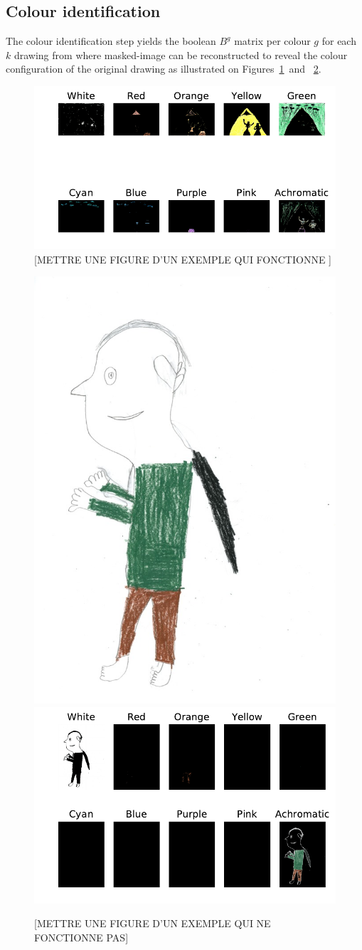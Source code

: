 \documentclass[11pt,a4paper]{article}
\begin{document}
\subsection{Colour identification}

The colour identification step yields the boolean $B^g$ matrix per colour $g$ for each $k$ drawing from where masked-image can be reconstructed to reveal the colour configuration of the original drawing as illustrated on Figures~\ref{fig:example1}~and ~\ref{fig:example2}.

\begin{figure}[!h]
	\centering
	\includegraphics[width=0.62\linewidth]{figures/ru08_bo_f_pb_07_05_ali-rno_filter_mask.pdf}\hfil
	\caption{{[METTRE UNE FIGURE D'UN EXEMPLE QUI FONCTIONNE ]} }
	\label{fig:example1}
\end{figure}

\begin{figure}[!h]
	\centering
	\includegraphics[width=0.32\linewidth]{figures/ch15_fr_m_rrs_08_08_fim-r.jpg}
	\includegraphics[width=0.62\linewidth]{figures/ch15_fr_m_rrs_08_08_fim-rno_filter_mask.pdf}
	\caption{{[METTRE UNE FIGURE D'UN EXEMPLE QUI NE FONCTIONNE PAS]} }
	\label{fig:example2}
\end{figure}
\end{document}
